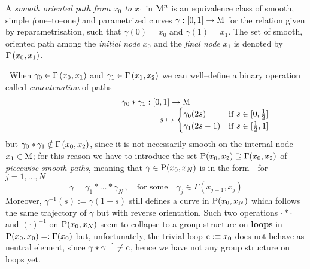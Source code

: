 \begin{defi}
    A \emph{smooth oriented path from $x_0$ to $x_1$} in $\M^n$ is an equivalence class of smooth, simple \emph{(}one--to--one\emph{)} and parametrized curves $\gamma:[0,1]\to\M$ for the relation given by reparametrisation, such that $\gamma(0)=x_0$ and $\gamma(1)=x_1$. The set of smooth, oriented path among the \emph{initial node} $x_0$ and the \emph{final node} $x_1$ is denoted by $\Sec{x_0,x_1}$.
\end{defi}
\,\newline
When $\gamma_0\in\Sec{x_0,x_1}$ and $\gamma_1\in\Sec{x_1,x_2}$ we can well--define a binary operation called \emph{concatenation} of paths
$$\begin{matrix}
    \gamma_0*\gamma_1:[0,1]\to\M\\
    \qquad\qquad\qquad\qquad\qquad\qquad\qquad s\mapsto\begin{cases}
        \gamma_0(2s) &\text{if}\,\,s\in[0,\frac{1}{2}]\\
        \gamma_1(2s-1) &\text{if}\,\,s\in[\frac{1}{2},1]
    \end{cases}
\end{matrix}$$
but $\gamma_0*\gamma_1\notin\Sec{x_0,x_2}$, since it is not necessarily smooth on the internal node $x_1\in\M$; for this reason we have to introduce the set $\P(x_0,x_2)\supseteq\Gamma(x_0,x_2)$ of \emph{piecewise smooth paths}, meaning that $\gamma\in\P(x_0,x_N)$ is in the form---for $j=1,\hdots,N$
$$\gamma=\gamma_1*\hdots*\gamma_N\,,\quad\text{for some}\quad\gamma_j\in\Gamma(x_{j-1},x_j)$$
Moreover, $\gamma^{-1}(s):=\gamma(1-s)$ still defines a curve in $\P(x_0,x_N)$ which follows the same trajectory of $\gamma$ but with reverse orientation. Such two operations $\cdot*\cdot$ and $(\cdot)^{-1}$ on $\P(x_0,x_N)$ seem to collapse to a group structure on \textbf{loops} in $\P(x_0,x_0)=:\Gamma(x_0)$ but, unfortunately, the trivial loop $\c:\equiv x_0$ does not behave as neutral element, since $\gamma*\gamma^{-1}\neq\c$, hence we have not any group structure on loops yet.\\


